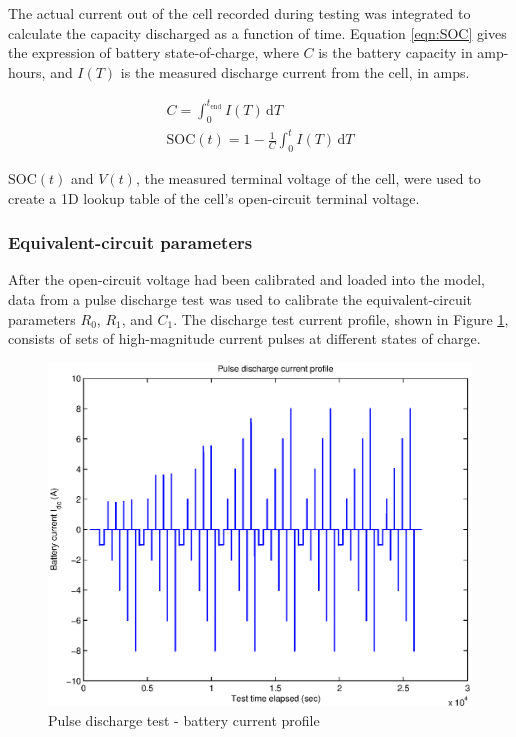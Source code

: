 \documentclass[../SimBALink.tex]{subfiles}
\begin{document}
			The actual current out of the cell recorded during testing was integrated to calculate the capacity discharged as a function of time. Equation \ref{eqn:SOC} gives the expression of battery state-of-charge, where $C$ is the battery capacity in amp-hours, and $I(T)$ is the measured discharge current from the cell, in amps.
		
			\begin{gather}
				C = \int_0^{t_\text{end}} \! I(T) \, \mathrm{d}T				\\
				\text{SOC}(t) = 1 - \frac{1}{C} \int_0^{t} \! I(T) \, \mathrm{d}T
				\label{eqn:SOC}
			\end{gather} 
		
			$\text{SOC}(t)$ and $V(t)$, the measured terminal voltage of the cell, were used to create a 1D lookup table of the cell's open-circuit terminal voltage.
			
			\FloatBarrier
			
		\subsubsection{Equivalent-circuit parameters}
			After the open-circuit voltage had been calibrated and loaded into the model, data from a pulse discharge test was used to calibrate the equivalent-circuit parameters $R_0$, $R_1$, and $C_1$. The discharge test current profile, shown in Figure \ref{fig:Pulse_Discharge_Current_Profile}, consists of sets of high-magnitude current pulses at different states of charge.
			
			\begin{figure}[h!]
				\centering
				\includegraphics[width=5in]{Pulse_Discharge_Current_Profile}
				\caption{Pulse discharge test - battery current profile}
				\label{fig:Pulse_Discharge_Current_Profile}
			\end{figure}
			
\end{document}
